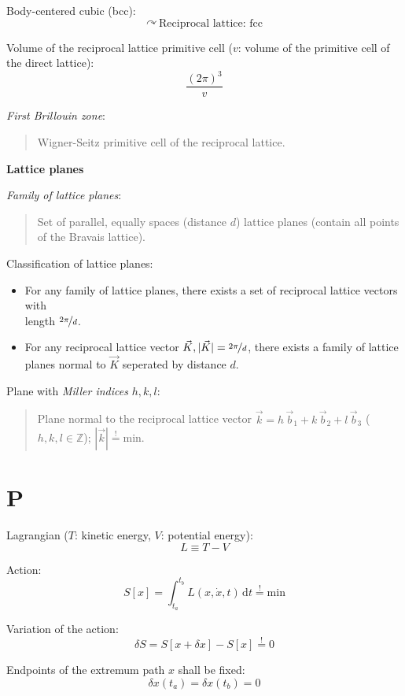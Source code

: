 \documentclass[fontsize=11pt,a4paper]{scrartcl}
\begin{document}
Body-centered cubic (bcc):
\[
	\curvearrowright\,\text{Reciprocal lattice: fcc}
\]

Volume of the reciprocal lattice primitive cell ($v$: volume of the primitive cell of the direct lattice):
\[
	\frac{(2\pi)^3}{v}
\]

\emph{First Brillouin zone}:
\begin{quote}
	Wigner-Seitz primitive cell of the reciprocal lattice.
\end{quote}

\textbf{\normalsize{Lattice planes}}

\emph{Family of lattice planes}:
\begin{quote}
	Set of parallel, equally spaces (distance $d$) lattice planes (contain all points of the Bravais lattice).
\end{quote}

Classification of lattice planes:
\begin{itemize}
	\item For any family of lattice planes, there exists a set of reciprocal lattice vectors with\\ length $\nicefrac{2\pi}{d}$.
	\item For any reciprocal lattice vector $\vec K, |\vec K|=\nicefrac{2\pi}{d}$, there exists a family of lattice planes normal to $\vec K$ seperated by distance $d$.
\end{itemize}

Plane with \emph{Miller indices} $h,k,l$:
\begin{quote}
	Plane normal to the reciprocal lattice vector $\vec k=h\,\vec b_1+k\,\vec b_2+l\,\vec b_3$ ($h,k,l\in\mathbb{Z}$); $|\vec k|\stackrel{!}{=}\text{min}$.
\end{quote}
%
%
%
%
%
\section{P}

Lagrangian ($T$: kinetic energy, $V$: potential energy):
\[
	L\equiv T-V
\]

Action:
\[
	S[x]=\int_{t_a}^{t_b} L(x,\dot x,t)\,\mathrm{d}t\stackrel{!}{=}\text{min}
\]

Variation of the action:
\[
	\delta S=S[x+\delta x]-S[x]\stackrel{!}{=}0
\]

Endpoints of the extremum path $x$ shall be fixed:
\[
	\delta x(t_a)=\delta x(t_b)=0
\]
\end{document}
